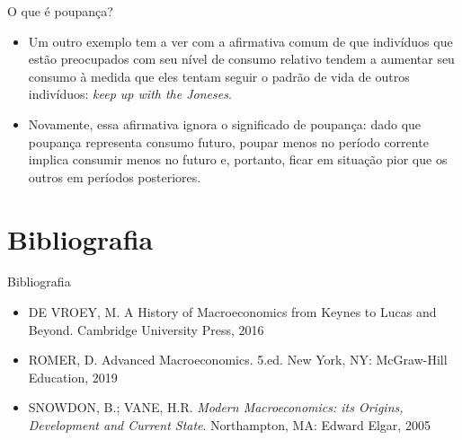\documentclass[10pt]{beamer}
\begin{document}
\begin{frame}{O que é poupança?}
    \begin{itemize}
        \item Um outro exemplo tem a ver com a afirmativa comum de que indivíduos que estão preocupados com seu nível de consumo relativo tendem a aumentar seu consumo à medida que eles tentam seguir o padrão de vida de outros indivíduos: \emph{keep up with the Joneses}.
        \bigskip
        \item Novamente, essa afirmativa ignora o significado de poupança: dado que poupança representa consumo futuro, poupar menos no período corrente implica consumir menos no futuro e, portanto, ficar em situação pior que os outros em períodos posteriores.
    \end{itemize}
\end{frame}

\section{Bibliografia}
\begin{frame}{ Bibliografia}
    \begin{itemize}                        
        \item DE VROEY, M. A History of Macroeconomics from Keynes to Lucas and Beyond. Cambridge University Press, 2016\medskip
        \item ROMER, D. Advanced Macroeconomics. 5.ed. New York, NY: McGraw-Hill Education, 2019\medskip
        \item SNOWDON, B.; VANE, H.R. \emph{Modern Macroeconomics: its Origins, Development and Current State}. Northampton, MA: Edward Elgar, 2005\medskip        
    \end{itemize}
\end{frame}
\end{document}
